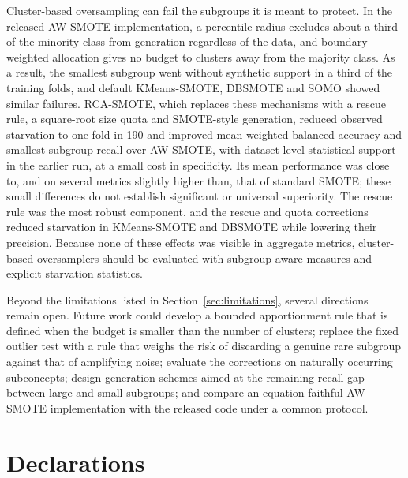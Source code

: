 \documentclass[preprint,nopreprintline]{elsarticle}
\theoremstyle{plain}
\theoremstyle{definition}
\begin{document}
Cluster-based oversampling can fail the subgroups it is meant to protect. In the released AW-SMOTE implementation, a percentile radius excludes about a third of the minority class from generation regardless of the data, and boundary-weighted allocation gives no budget to clusters away from the majority class. As a result, the smallest subgroup went without synthetic support in a third of the training folds, and default KMeans-SMOTE, DBSMOTE and SOMO showed similar failures. RCA-SMOTE, which replaces these mechanisms with a rescue rule, a square-root size quota and SMOTE-style generation, reduced observed starvation to one fold in 190 and improved mean weighted balanced accuracy and smallest-subgroup recall over AW-SMOTE, with dataset-level statistical support in the earlier run, at a small cost in specificity. Its mean performance was close to, and on several metrics slightly higher than, that of standard SMOTE; these small differences do not establish significant or universal superiority. The rescue rule was the most robust component, and the rescue and quota corrections reduced starvation in KMeans-SMOTE and DBSMOTE while lowering their precision. Because none of these effects was visible in aggregate metrics, cluster-based oversamplers should be evaluated with subgroup-aware measures and explicit starvation statistics.

Beyond the limitations listed in Section~\ref{sec:limitations}, several directions remain open. Future work could develop a bounded apportionment rule that is defined when the budget is smaller than the number of clusters; replace the fixed outlier test with a rule that weighs the risk of discarding a genuine rare subgroup against that of amplifying noise; evaluate the corrections on naturally occurring subconcepts; design generation schemes aimed at the remaining recall gap between large and small subgroups; and compare an equation-faithful AW-SMOTE implementation with the released code under a common protocol.

\sloppy


\section*{Declarations}
\end{document}
